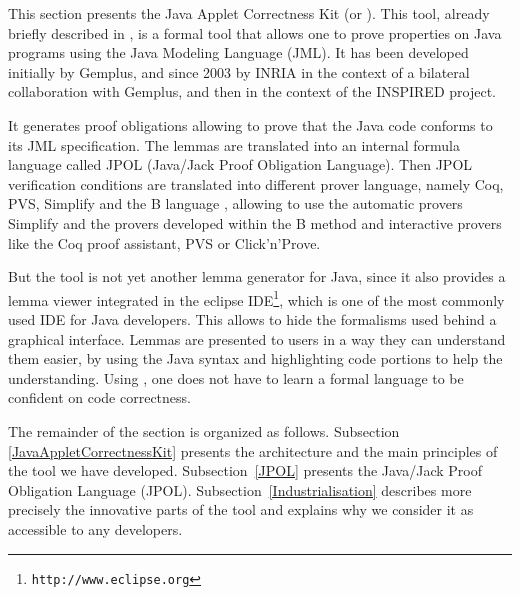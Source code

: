 This section presents the Java Applet Correctness Kit (or \JACK).
This tool, already briefly described in \cite{BRL-JACK}, is
a formal tool that allows one to prove properties on Java programs
using the Java Modeling Language \cite{Leavens-Baker-Ruby03} (JML).
It has been developed initially by Gemplus, and since 2003 by INRIA
in the context of a bilateral collaboration with Gemplus, and then
in the context of the INSPIRED project.


It generates proof obligations allowing to prove that the Java code
conforms to its JML specification.  The lemmas are translated into an
internal formula language called JPOL (Java/Jack Proof Obligation
Language). Then JPOL verification conditions are translated into
different prover language, namely Coq, PVS, Simplify and the B
language \cite{bbook}, allowing to use the automatic provers Simplify
and the provers developed within the B method and interactive provers
like the Coq proof assistant, PVS or Click'n'Prove.

 But the tool is not yet another lemma generator for Java, since it
 also provides a lemma viewer integrated in the eclipse
 IDE\footnote{\texttt{http://www.eclipse.org}}, which is one of the
 most commonly used IDE for Java developers.  This allows to hide the
 formalisms used behind a graphical interface.  Lemmas are presented
 to users in a way they can understand them easier, by using the Java
 syntax and highlighting code portions to help the
 understanding. Using \JACK, one does not have to learn a formal
 language to be confident on code correctness.

 The remainder of the section is organized as follows.  Subsection
 \ref{JavaAppletCorrectnessKit} presents the architecture and the main
 principles of the tool we have developed.  Subsection~\ref{JPOL}
 presents the Java/Jack Proof Obligation Language (JPOL).
 Subsection~\ref{Industrialisation} describes more precisely the
 innovative parts of the tool and explains why we consider it as
 accessible to any developers.

